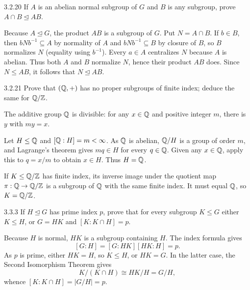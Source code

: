 \documentclass[11pt,oneside]{article}
\begin{document}
\begin{exercise}{3.2.20}
If $A$ is an abelian normal subgroup of $G$ and $B$ is any subgroup, prove $A\cap B\trianglelefteq AB$.
\end{exercise}

\begin{solution}
Because $A\trianglelefteq G$, the product $AB$ is a subgroup of $G$. Put $N=A\cap B$. If $b\in B$, then $bNb^{-1}\subseteq A$ by normality of $A$ and $bNb^{-1}\subseteq B$ by closure of $B$, so $B$ normalizes $N$ (equality using $b^{-1}$). Every $a\in A$ centralizes $N$ because $A$ is abelian. Thus both $A$ and $B$ normalize $N$, hence their product $AB$ does. Since $N\le AB$, it follows that $N\trianglelefteq AB$.
\end{solution}

\begin{exercise}{3.2.21}
Prove that $(\mathbb{Q},+)$ has no proper subgroups of finite index; deduce the same for $\mathbb{Q}/\mathbb{Z}$.
\end{exercise}

\begin{hint}
The additive group $\mathbb{Q}$ is divisible: for any $x\in\mathbb{Q}$ and positive integer $m$, there is $y$ with $my=x$.
\end{hint}

\begin{solution}
Let $H\le\mathbb{Q}$ and $[\mathbb{Q}:H]=m<\infty$. As $\mathbb{Q}$ is abelian, $\mathbb{Q}/H$ is a group of order $m$, and Lagrange's theorem gives $mq\in H$ for every $q\in\mathbb{Q}$. Given any $x\in\mathbb{Q}$, apply this to $q=x/m$ to obtain $x\in H$. Thus $H=\mathbb{Q}$.

If $K\le\mathbb{Q}/\mathbb{Z}$ has finite index, its inverse image under the quotient map $\pi:\mathbb{Q}\to\mathbb{Q}/\mathbb{Z}$ is a subgroup of $\mathbb{Q}$ with the same finite index. It must equal $\mathbb{Q}$, so $K=\mathbb{Q}/\mathbb{Z}$.
\end{solution}

\begin{exercise}{3.3.3}
If $H\trianglelefteq G$ has prime index $p$, prove that for every subgroup $K\le G$ either $K\le H$, or $G=HK$ and $[K:K\cap H]=p$.
\end{exercise}

\begin{solution}
Because $H$ is normal, $HK$ is a subgroup containing $H$. The index formula gives
\[
 [G:H]=[G:HK][HK:H]=p.
\]
As $p$ is prime, either $HK=H$, so $K\le H$, or $HK=G$. In the latter case, the Second Isomorphism Theorem gives
\[
 K/(K\cap H)\cong HK/H=G/H,
\]
whence $[K:K\cap H]=|G/H|=p$.
\end{solution}
\end{document}

